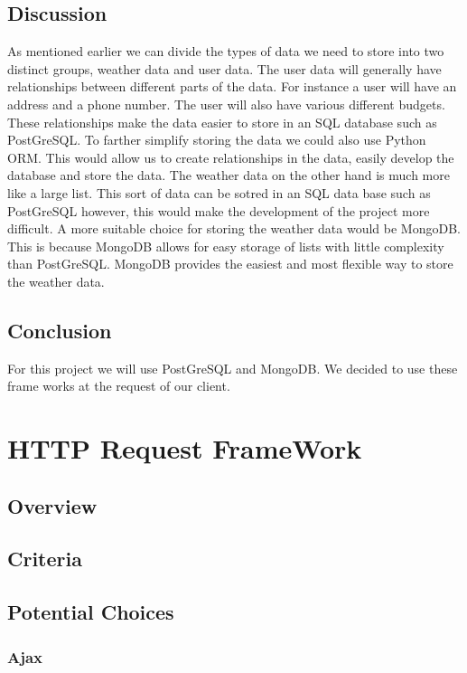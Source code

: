 \documentclass[letterpaper,10pt]{article}
\begin{document}
	\subsection{Discussion}
		As mentioned earlier we can divide the types of data we need to store into two distinct groups, weather data and user data. The user data will generally have relationships between different parts of the data. For instance a user will have an address and a phone number. The user will also have various different budgets. These relationships make the data easier to store in an SQL database such as PostGreSQL. To farther simplify storing the data we could also use Python ORM. This would allow us to create relationships in the data, easily develop the database and store the data. The weather data on the other hand is much more like a large list. This sort of data can be sotred in an SQL data base such as PostGreSQL however, this would make the development of the project more difficult. A more suitable choice for storing the weather data would be MongoDB. This is because MongoDB allows for easy storage of lists with little complexity than PostGreSQL. MongoDB provides the easiest and most flexible way to store the weather data.
	\subsection{Conclusion}
		For this project we will use PostGreSQL and MongoDB. We decided to use these frame works at the request of our client. 
	
	
\section{HTTP Request FrameWork}
		\subsection{Overview}
	
	\subsection{Criteria}
	
	\subsection{Potential Choices}
		\subsubsection{Ajax}
		
\end{document}
